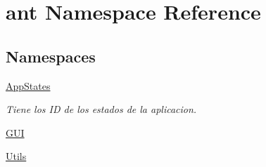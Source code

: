 \hypertarget{namespaceant}{\section{ant Namespace Reference}
\label{namespaceant}
}
\subsection*{Namespaces}
\begin{DoxyCompactItemize}
\item 
 \hyperlink{namespaceant_1_1_app_states}{App\+States}
\begin{DoxyCompactList}\small\item\em Tiene los I\+D de los estados de la aplicacion. \end{DoxyCompactList}\item 
 \hyperlink{namespaceant_1_1_g_u_i}{G\+U\+I}
\item 
 \hyperlink{namespaceant_1_1_utils}{Utils}
\end{DoxyCompactItemize}
